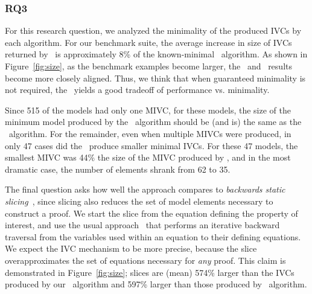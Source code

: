 \subsubsection{RQ3}
For this research question, we analyzed the minimality of the produced IVCs by each algorithm.  For our benchmark suite, the average increase in size of IVCs returned by \ucalg\ is approximately 8\% of the known-minimal \ucbfalg\ algorithm.  As shown in Figure~\ref{fig:size}, as the benchmark examples become larger, the \ucalg\ and \ucbfalg\ results become more closely aligned.  Thus, we think that when guaranteed minimality is not required, the \ucalg\ yields a good tradeoff of performance vs. minimality.

Since 515 of the models had only one MIVC, for these models, the size of the minimum model produced by the \aivcalg\ algorithm should be (and is) the same as the \ucbfalg\ algorithm.  For the remainder, even when multiple MIVCs were produced, in only 47 cases did the \aivcalg\ produce smaller minimal IVCs.  For these 47 models, the smallest MIVC was 44\% the size of the MIVC produced by \ucbfalg, and in the most dramatic case, the number of elements shrank from 62 to 35. %

The final question asks how well the approach compares to {\em backwards static slicing}~\cite{Tip95asurvey}, since slicing also reduces the set of model elements necessary to construct a proof.  We start the slice from the equation defining the property of interest, and use the usual approach~\cite{Gaucher03:slicing} that performs an iterative backward traversal from the variables used within an equation to their defining equations.  We expect the IVC mechanism to be more precise, because the slice overapproximates the set of equations necessary for {\em any} proof.  This claim is demonstrated in Figure~\ref{fig:size}; slices are (mean) 574\% larger than the IVCs produced by our \ucalg\ algorithm and 597\% larger than those produced by \ucbfalg\ algorithm.




